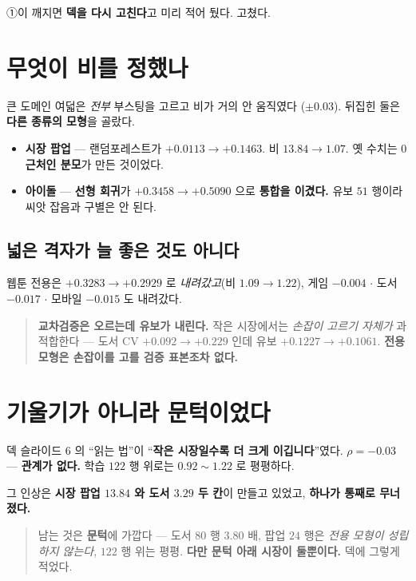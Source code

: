 \documentclass[11pt]{article}
\begin{document}
①이 깨지면 \textbf{덱을 다시 고친다}고 미리 적어 뒀다. 고쳤다.

\section{무엇이 비를 정했나}

큰 도메인 여덟은 \emph{전부} 부스팅을 고르고 비가 거의 안 움직였다
($\pm 0.03$). 뒤집힌 둘은 \textbf{다른 종류의 모형}을 골랐다.

\begin{itemize}
\item \textbf{시장 팝업} --- 랜덤포레스트가 $+0.0113 \to \mathbf{+0.1463}$.
비 $13.84 \to 1.07$. 옛 수치는 \textbf{$0$ 근처인 분모}가 만든 것이었다.
\item \textbf{아이돌} --- \textbf{선형 회귀}가 $+0.3458 \to \mathbf{+0.5090}$
으로 \textbf{통합을 이겼다.} 유보 $51$ 행이라 씨앗 잡음과 구별은 안 된다.
\end{itemize}

\subsection*{넓은 격자가 늘 좋은 것도 아니다}

웹툰 전용은 $+0.3283 \to \mathbf{+0.2929}$ 로 \emph{내려갔고}(비
$1.09 \to 1.22$), 게임 $-0.004$ $\cdot$ 도서 $-0.017$ $\cdot$ 모바일
$-0.015$ 도 내려갔다.

\begin{quote}
\textbf{교차검증은 오르는데 유보가 내린다.} 작은 시장에서는 \emph{손잡이
고르기 자체가} 과적합한다 --- 도서 CV $+0.092 \to +0.229$ 인데 유보
$+0.1227 \to +0.1061$. \textbf{전용 모형은 손잡이를 고를 검증 표본조차
없다.}
\end{quote}

\section{기울기가 아니라 문턱이었다}

덱 슬라이드 $6$ 의 ``읽는 법''이 ``\textbf{작은 시장일수록 더 크게
이깁니다}''였다. $\rho = -0.03$ --- \textbf{관계가 없다.} 학습 $122$ 행
위로는 $0.92 \sim 1.22$ 로 평평하다.

그 인상은 \textbf{시장 팝업 $13.84$ 와 도서 $3.29$ 두 칸}이 만들고
있었고, \textbf{하나가 통째로 무너졌다.}

\begin{quote}
남는 것은 \textbf{문턱}에 가깝다 --- 도서 $80$ 행 $3.80$ 배, 팝업 $24$ 행은
\emph{전용 모형이 성립하지 않는다}, $122$ 행 위는 평평. \textbf{다만 문턱
아래 시장이 둘뿐이다.} 덱에 그렇게 적었다.
\end{quote}
\end{document}
